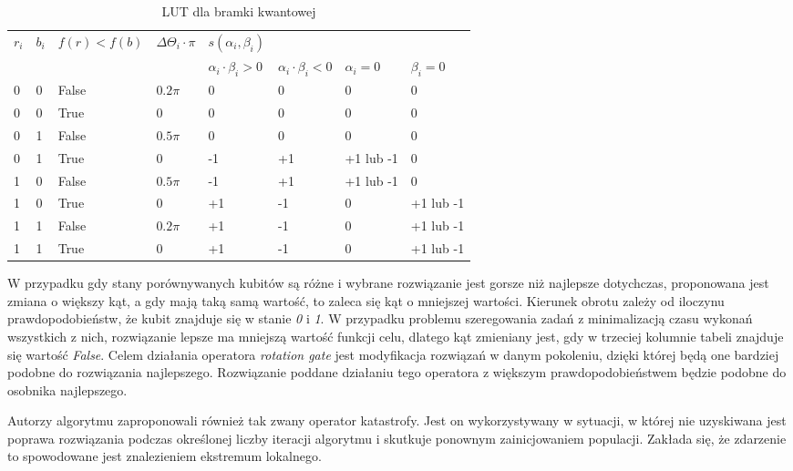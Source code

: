 \begin{table}[h]
\label{LUT_TAB}
\begin{tabular}{l l l l l l l l}
\hline
$r_i$ & $b_i$ & $f(r)<f(b)$ & $\Delta\Theta_i \cdot \pi$ & $s(\alpha_i,\beta_i)$ & & & \\
\cline{5-8} 
& & & & $\alpha_i \cdot \beta_i > 0$ & $\alpha_i \cdot \beta_i < 0$ & $\alpha_i = 0$ & $\beta_i = 0$ \\
\hline
0 & 0 & False & $0.2\pi$ & 0 & 0 & 0 & 0\\
0 & 0 & True  & 0        & 0 & 0 & 0 & 0\\
0 & 1 & False & $0.5\pi$ & 0 & 0 & 0 & 0\\
0 & 1 & True  & 0        & -1 & +1 & +1 lub -1 & 0\\
1 & 0 & False & $0.5\pi$ & -1 & +1 & +1 lub -1 & 0\\
1 & 0 & True  & 0        & +1 & -1 & 0 & +1 lub -1\\
1 & 1 & False & $0.2\pi$ & +1 & -1 & 0 & +1 lub -1\\
1 & 1 & True  & 0        & +1 & -1 & 0 & +1 lub -1\\
\hline
\end{tabular}
\caption{LUT dla bramki kwantowej}
\end{table}

W przypadku gdy stany porównywanych kubitów są różne i wybrane rozwiązanie jest gorsze niż najlepsze dotychczas, proponowana jest zmiana o większy kąt, a gdy mają taką samą wartość, to zaleca się kąt o mniejszej wartości. Kierunek obrotu zależy od iloczynu prawdopodobieństw, że kubit znajduje się w stanie \textit{0} i \textit{1}. W przypadku problemu szeregowania zadań z minimalizacją czasu wykonań wszystkich z nich, rozwiązanie lepsze ma mniejszą wartość funkcji celu, dlatego kąt zmieniany jest, gdy w trzeciej kolumnie tabeli znajduje się wartość \textit{False}. Celem działania operatora \textit{rotation gate} jest  modyfikacja rozwiązań w danym pokoleniu, dzięki której będą one bardziej podobne do rozwiązania najlepszego. Rozwiązanie poddane działaniu tego operatora z większym prawdopodobieństwem będzie podobne do osobnika najlepszego.

Autorzy algorytmu zaproponowali również tak zwany operator katastrofy. Jest on wykorzystywany w sytuacji, w której nie uzyskiwana jest poprawa rozwiązania podczas określonej liczby iteracji algorytmu i skutkuje ponownym zainicjowaniem populacji. Zakłada się, że zdarzenie to spowodowane jest znalezieniem ekstremum lokalnego.

